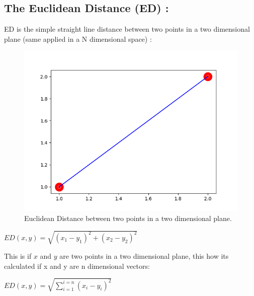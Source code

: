 \documentclass[10pt,a4paper]{article}
\begin{document}
\subsection{The Euclidean Distance (ED) :}
ED is the simple straight line distance between two points in a two dimensional plane (same applied in a N dimensional space) :\\

\begin{figure}[H]
\centering
\includegraphics[scale=0.5]{ED.png}
\caption{Euclidean Distance between two points in a two dimensional plane.}
\end{figure}
\begin{center}
$ ED(x,y) = \sqrt{(x_1 - y_1)^2 + (x_2 - y_2)^2} $
\end{center}
This is if $ x $ and $ y $ are two points in a two dimensional plane, this how its calculated if x and y are n dimensional vectors:
\begin{center}
$ ED(x,y) = \sqrt{\sum_{i=1}^{i=n}(x_i - y_i)^2} $
\end{center}
\end{document}
